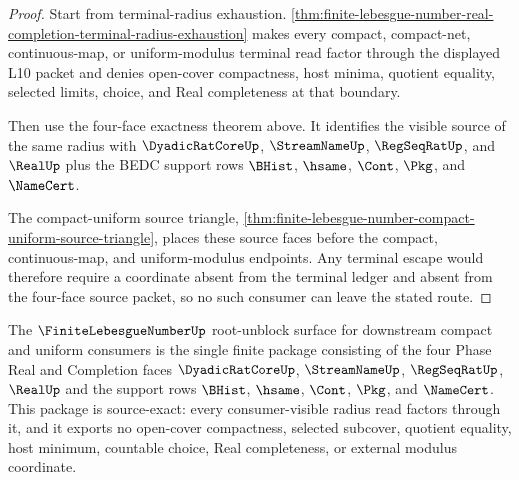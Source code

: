 \begin{proof}
Start from terminal-radius exhaustion. \autoref{thm:finite-lebesgue-number-real-completion-terminal-radius-exhaustion} makes every compact, compact-net, continuous-map, or uniform-modulus terminal read factor through the displayed L10 packet and denies open-cover compactness, host minima, quotient equality, selected limits, choice, and Real completeness at that boundary.

Then use the four-face exactness theorem above. It identifies the visible source of the same radius with $\DyadicRatCoreUp$, $\StreamNameUp$, $\RegSeqRatUp$, and $\RealUp$ plus the BEDC support rows $\BHist$, $\hsame$, $\Cont$, $\Pkg$, and $\NameCert$.

The compact-uniform source triangle, \autoref{thm:finite-lebesgue-number-compact-uniform-source-triangle}, places these source faces before the compact, continuous-map, and uniform-modulus endpoints. Any terminal escape would therefore require a coordinate absent from the terminal ledger and absent from the four-face source packet, so no such consumer can leave the stated route.
\end{proof}

\begin{theorem}
\label{thm:finite-lebesgue-number-phase-real-root-unblock-package}
The $\FiniteLebesgueNumberUp$ root-unblock surface for downstream compact and uniform consumers is the single finite package consisting of the four Phase Real and Completion faces $\DyadicRatCoreUp$, $\StreamNameUp$, $\RegSeqRatUp$, $\RealUp$ and the support rows $\BHist$, $\hsame$, $\Cont$, $\Pkg$, and $\NameCert$. This package is source-exact: every consumer-visible radius read factors through it, and it exports no open-cover compactness, selected subcover, quotient equality, host minimum, countable choice, Real completeness, or external modulus coordinate.
\end{theorem}

